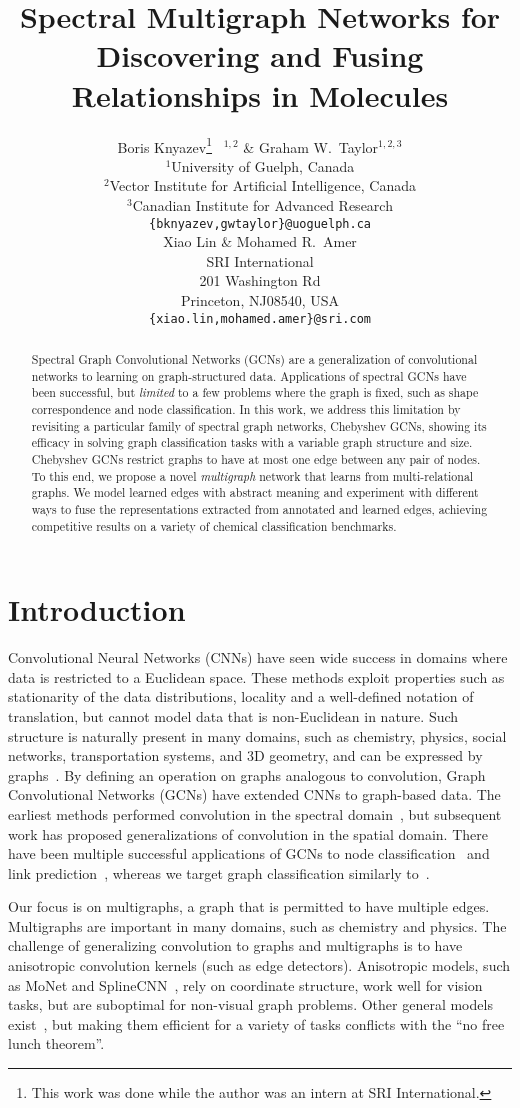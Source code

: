 \documentclass[final,nonatbib]{article} \usepackage{nips_2018}
\title{Spectral Multigraph Networks for Discovering and Fusing Relationships in Molecules}
\author{Boris Knyazev\thanks{This work was done while the author was an intern at SRI International.}  \ $^{1,2}$ \& Graham W.~Taylor$^{1,2,3}$\\
	$^1$University of Guelph, Canada \\
	$^2$Vector Institute for Artificial Intelligence, Canada \\
	$^3$Canadian Institute for Advanced Research\\
	\texttt{\{bknyazev,gwtaylor\}@uoguelph.ca} \\
	\And
	Xiao Lin \& Mohamed R.~Amer \\
	SRI International \\
	201 Washington Rd\\
	Princeton, NJ08540, USA\\
	\texttt{\{xiao.lin,mohamed.amer\}@sri.com}
}
\begin{document}
	\maketitle
\begin{abstract}
		Spectral Graph Convolutional Networks (GCNs) are a generalization of convolutional networks to learning on graph-structured data.
Applications of spectral GCNs have been successful, but \textit{limited} to a few problems where the graph is fixed, such as shape correspondence and node classification. In this work, we address this limitation by revisiting a particular family of spectral graph networks, Chebyshev GCNs, showing its efficacy in solving graph classification tasks with a variable graph structure and size. Chebyshev GCNs restrict graphs to have at most one edge between any pair of nodes. To this end, we propose a novel \textit{multigraph} network that learns from multi-relational graphs. We model learned edges with abstract meaning and experiment with different ways to fuse the representations extracted from annotated and learned edges, achieving competitive results on a variety of chemical classification benchmarks.
	\end{abstract}
\section{Introduction}\label{sec:intro}
	Convolutional Neural Networks (CNNs) have seen wide success in domains where data is restricted to a Euclidean space. These methods exploit properties such as stationarity of the data distributions, locality and a well-defined notation of translation, but cannot model data that is non-Euclidean in nature. Such structure is naturally present in many domains, such as chemistry, physics, social networks, transportation systems, and 3D geometry, and can be expressed by graphs~\cite{bronstein2017geometric, hamilton2017representation}. By defining an operation on graphs analogous to convolution, Graph Convolutional Networks (GCNs) have extended CNNs to graph-based data. The earliest methods performed convolution in the spectral domain~\cite{bruna2013spectral}, but subsequent work has proposed generalizations of convolution in the spatial domain. There have been multiple successful applications of GCNs to node classification~\cite{velickovic2017graph} and link prediction~\cite{schlichtkrull2018modeling}, whereas we target graph classification similarly to~\cite{simonovsky2017dynamic}.

	Our focus is on multigraphs, a graph that is permitted to have multiple edges. Multigraphs are important in many domains, such as chemistry and physics.
	The challenge of generalizing convolution to graphs and multigraphs is to have anisotropic convolution kernels (such as edge detectors). Anisotropic models, such as MoNet \cite{monti2017geometric} and SplineCNN~\cite{fey2018splinecnn}, rely on coordinate structure, work well for vision tasks, but are suboptimal for non-visual graph problems. Other general models exist~\cite{gilmer2017neural, battaglia2018relational}, but making them efficient for a variety of tasks conflicts with the ``no free lunch theorem''.
\end{document}
